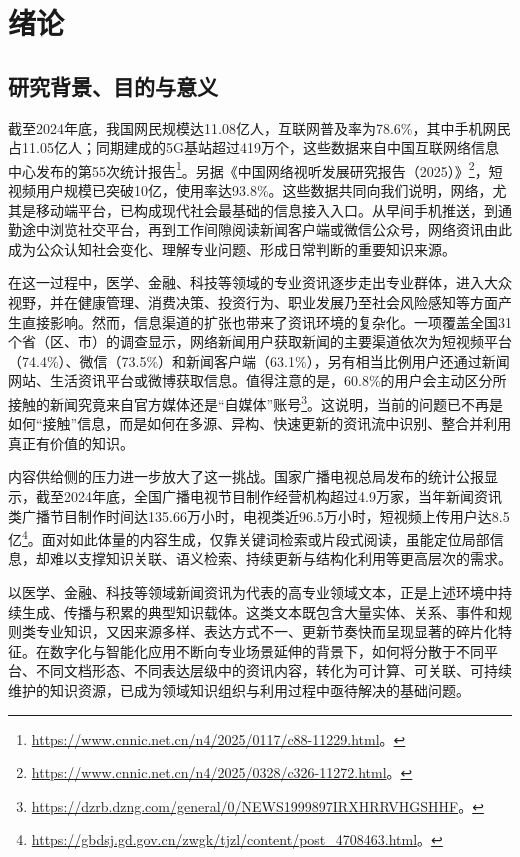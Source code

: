
\chapter{绪论}
\label{chap:intro}

\section{研究背景、目的与意义}

截至2024年底，我国网民规模达11.08亿人，互联网普及率为78.6\%，其中手机网民占11.05亿人；同期建成的5G基站超过419万个，这些数据来自中国互联网络信息中心发布的第55次统计报告\footnote{\url{https://www.cnnic.net.cn/n4/2025/0117/c88-11229.html}。}。另据《中国网络视听发展研究报告（2025）》\footnote{\url{https://www.cnnic.net.cn/n4/2025/0328/c326-11272.html}。}，短视频用户规模已突破10亿，使用率达93.8\%。这些数据共同向我们说明，网络，尤其是移动端平台，已构成现代社会最基础的信息接入入口。从早间手机推送，到通勤途中浏览社交平台，再到工作间隙阅读新闻客户端或微信公众号，网络资讯由此成为公众认知社会变化、理解专业问题、形成日常判断的重要知识来源。

在这一过程中，医学、金融、科技等领域的专业资讯逐步走出专业群体，进入大众视野，并在健康管理、消费决策、投资行为、职业发展乃至社会风险感知等方面产生直接影响。然而，信息渠道的扩张也带来了资讯环境的复杂化。一项覆盖全国31个省（区、市）的调查显示，网络新闻用户获取新闻的主要渠道依次为短视频平台（74.4\%）、微信（73.5\%）和新闻客户端（63.1\%），另有相当比例用户还通过新闻网站、生活资讯平台或微博获取信息。值得注意的是，60.8\%的用户会主动区分所接触的新闻究竟来自官方媒体还是“自媒体”账号\footnote{\url{https://dzrb.dzng.com/general/0/NEWS1999897IRXHRRVHGSHHF}。}。这说明，当前的问题已不再是如何“接触”信息，而是如何在多源、异构、快速更新的资讯流中识别、整合并利用真正有价值的知识。

内容供给侧的压力进一步放大了这一挑战。国家广播电视总局发布的统计公报显示，截至2024年底，全国广播电视节目制作经营机构超过4.9万家，当年新闻资讯类广播节目制作时间达135.66万小时，电视类近96.5万小时，短视频上传用户达8.5亿\footnote{\url{https://gbdsj.gd.gov.cn/zwgk/tjzl/content/post_4708463.html}。}。面对如此体量的内容生成，仅靠关键词检索或片段式阅读，虽能定位局部信息，却难以支撑知识关联、语义检索、持续更新与结构化利用等更高层次的需求。

以医学、金融、科技等领域新闻资讯为代表的高专业领域文本，正是上述环境中持续生成、传播与积累的典型知识载体。这类文本既包含大量实体、关系、事件和规则类专业知识，又因来源多样、表达方式不一、更新节奏快而呈现显著的碎片化特征。在数字化与智能化应用不断向专业场景延伸的背景下，如何将分散于不同平台、不同文档形态、不同表达层级中的资讯内容，转化为可计算、可关联、可持续维护的知识资源，已成为领域知识组织与利用过程中亟待解决的基础问题。


